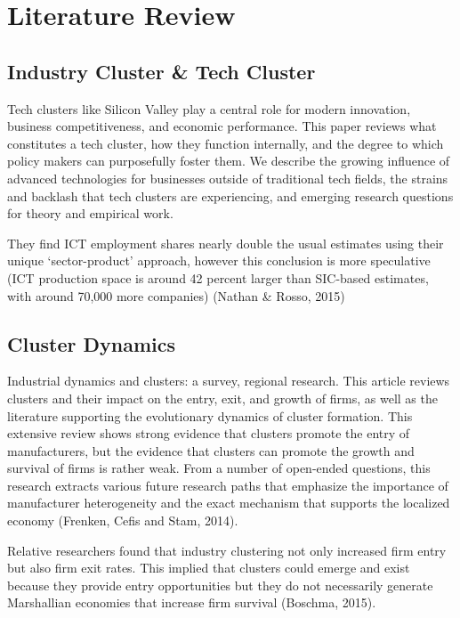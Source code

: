 \documentclass[
  12pt,
  oneside]{book}
\begin{document}
\hypertarget{lit-review}{%
\chapter{Literature Review}\label{lit-review}}

\hypertarget{industry-cluster-tech-cluster}{%
\section{Industry Cluster \& Tech Cluster}\label{industry-cluster-tech-cluster}}

Tech clusters like Silicon Valley play a central role for modern innovation, business competitiveness, and economic performance. This paper reviews what constitutes a tech cluster, how they function internally, and the degree to which policy makers can purposefully foster them. We describe the growing influence of advanced technologies for businesses outside of traditional tech fields, the strains and backlash that tech clusters are experiencing, and emerging research questions for theory and empirical work.

They find ICT employment shares nearly double the usual estimates using their unique `sector-product' approach, however this conclusion is more speculative (ICT production space is around 42 percent larger than SIC-based estimates, with around 70,000 more companies)
(Nathan \& Rosso, 2015)

\hypertarget{cluster-dynamics}{%
\section{Cluster Dynamics}\label{cluster-dynamics}}

Industrial dynamics and clusters: a survey, regional research. This article reviews clusters and their impact on the entry, exit, and growth of firms, as well as the literature supporting the evolutionary dynamics of cluster formation. This extensive review shows strong evidence that clusters promote the entry of manufacturers, but the evidence that clusters can promote the growth and survival of firms is rather weak. From a number of open-ended questions, this research extracts various future research paths that emphasize the importance of manufacturer heterogeneity and the exact mechanism that supports the localized economy (Frenken, Cefis and Stam, 2014).

Relative researchers found that industry clustering not only increased firm entry but also firm exit rates. This implied that clusters could emerge and exist because they provide entry opportunities but they do not necessarily generate Marshallian economies that increase firm survival (Boschma, 2015).
\end{document}
